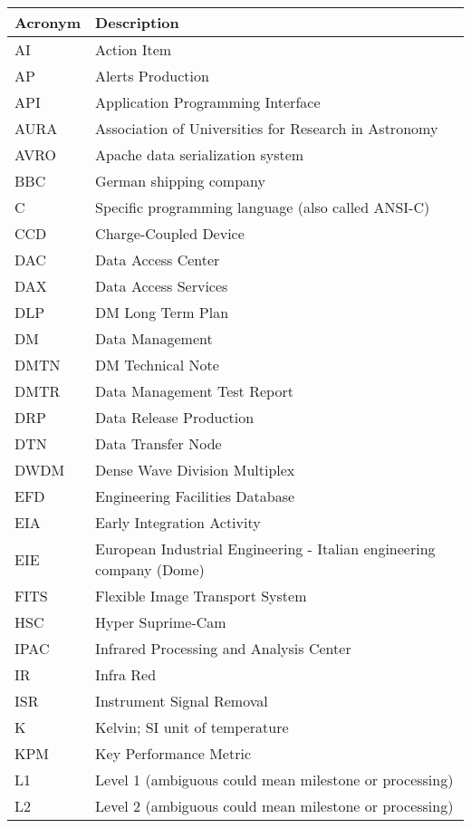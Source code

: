 \addtocounter{table}{-1}
\begin{longtable}{|l|p{}|}\hline
\textbf{Acronym} & \textbf{Description}  \\\hline

AI & Action Item \\\hline
AP & Alerts Production \\\hline
API & Application Programming Interface \\\hline
AURA & Association of Universities for Research in Astronomy \\\hline
AVRO & Apache data serialization system \\\hline
BBC & German shipping company \\\hline
C & Specific programming language (also called ANSI-C) \\\hline
CCD & Charge-Coupled Device \\\hline
DAC & Data Access Center \\\hline
DAX & Data Access Services \\\hline
DLP & DM Long Term Plan \\\hline
DM & Data Management \\\hline
DMTN & DM Technical Note \\\hline
DMTR & Data Management Test Report \\\hline
DRP & Data Release Production \\\hline
DTN & Data Transfer Node \\\hline
DWDM & Dense Wave Division Multiplex \\\hline
EFD & Engineering Facilities Database \\\hline
EIA & Early Integration Activity \\\hline
EIE & European Industrial Engineering  - Italian engineering company (Dome) \\\hline
FITS & Flexible Image Transport System \\\hline
HSC & Hyper Suprime-Cam \\\hline
IPAC & Infrared Processing and Analysis Center \\\hline
IR & Infra Red \\\hline
ISR & Instrument Signal Removal \\\hline
K & Kelvin; SI unit of temperature \\\hline
KPM & Key Performance Metric \\\hline
L1 & Level 1 (ambiguous could mean milestone or processing) \\\hline
L2 & Level 2 (ambiguous could mean milestone or processing) \\\hline

\end{longtable}
